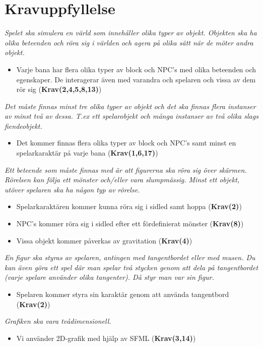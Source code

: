 \documentclass{TDP003mall}
\begin{document}
\section{Kravuppfyllelse}
\textit{Spelet ska simulera en värld som innehåller olika typer av objekt. Objekten ska ha olika beteenden och röra
sig i världen och agera på olika sätt när de möter andra objekt.}
\begin{itemize}
\item Varje bana har flera olika typer av block och NPC's med olika beteenden och egenskaper. De interagerar även med varandra och spelaren och vissa av dem rör sig (\textbf{Krav(2,4,5,8,13)})
\end{itemize}


\noindent\textit{Det måste finnas minst tre olika typer av objekt och det ska finnas flera instanser av minst två av dessa.
T.ex ett spelarobjekt och många instanser av två olika slags fiendeobjekt.}
\begin{itemize}
\item Det kommer finnas flera olika typer av block och NPC's samt minst en spelarkaraktär på varje bana (\textbf{Krav(1,6,17)})
\end{itemize}

\noindent\textit{Ett beteende som måste finnas med är att figurerna ska röra sig över skärmen. Rörelsen kan följa ett
mönster och/eller vara slumpmässig. Minst ett objekt, utöver spelaren ska ha någon typ av rörelse.}
\begin{itemize}
\item Spelarkaraktären kommer kunna röra sig i sidled samt hoppa (\textbf{Krav(2)})
\item NPC's kommer röra sig i sidled efter ett fördefinierat mönster (\textbf{Krav(8)})
\item Vissa objekt kommer påverkas av gravitation (\textbf{Krav(4)})
\end{itemize}

\noindent\textit{En figur ska styras av spelaren, antingen med tangentbordet eller med musen. Du kan även göra ett spel där
man spelar två stycken genom att dela på tangentbordet (varje spelare använder olika tangenter). Då styr
man var sin figur.}
\begin{itemize}
\item Spelaren kommer styra sin karaktär genom att använda tangentbord (\textbf{Krav(2)})
\end{itemize}

\noindent\textit{Grafiken ska vara tvådimensionell.}
\begin{itemize}
\item Vi använder 2D-grafik med hjälp av SFML (\textbf{Krav(3,14)})
\end{itemize}
\end{document}
